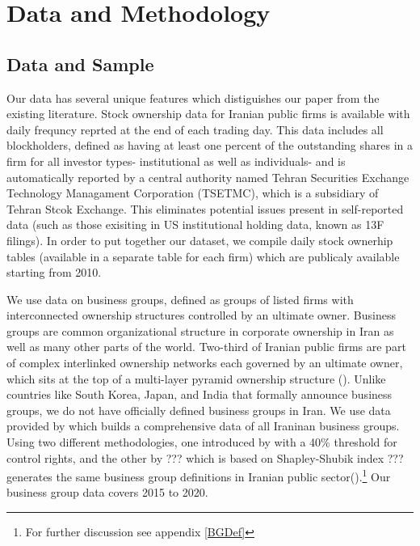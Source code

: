 
\section{{Data and Methodology}}



\subsection{{Data and Sample}}



Our data has several unique features which distiguishes our paper from the existing literature. Stock ownership data for Iranian public firms is available with daily frequncy reprted at the end of each trading day. This data includes all blockholders, defined as having at least one percent of the outstanding shares in a firm for all investor types- institutional as well as individuals- and is automatically reported by a central authority named Tehran Securities Exchange Technology Managament Corporation (TSETMC), which is a subsidiary of Tehran Stcok Exchange. This eliminates potential issues present in self-reported data (such as those exisiting in US institutional holding data, known as 13F filings). In order to put together our dataset, we compile daily stock ownerhip tables (available in a separate table for each firm) which are publicaly available starting from 2010.


We use data on business groups, defined as groups of listed firms with interconnected ownership structures controlled by an ultimate owner. Business groups are common organizational structure in corporate ownership in Iran as well as many other parts of the world. Two-third of Iranian public firms are part of complex interlinked ownership networks each governed by an ultimate owner, which sits at the top of a multi-layer pyramid ownership structure ({\cite{Aliabadi2022}}). Unlike countries like South Korea, Japan, and India that formally announce business groups, we do not have officially defined business groups in Iran. We use data provided by {\cite{Aliabadi2022}} which builds a comprehensive data of all Iraninan business groups.  Using two different methodologies, one introduced by \cite{almeida2011structure} with a 40\% threshold for control rights, and the other by {{???}} which is based on Shapley-Shubik index {{???}} generates the same business group definitions in Iranian public sector({\cite{Aliabadi2022}}).\footnote{For further discussion see appendix \ref{BGDef}} Our business group data covers 2015 to 2020. 



